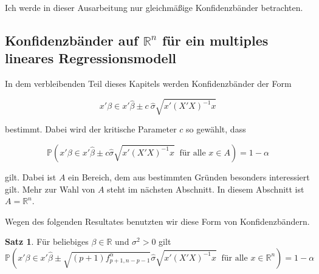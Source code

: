 \documentclass[12pt,a4paper]{article}
\theoremstyle{definition}
\newtheorem{Beispiel}[Definition]{Beispiel}
\theoremstyle{definition}
\newtheorem{Satz}[Definition]{Satz}
\theoremstyle{definition}
\begin{document}
Ich werde in dieser Ausarbeitung nur gleichmäßige Konfidenzbänder betrachten.



%
%
%
%

 

\subsection{Konfidenzbänder auf $\mathbb{R}^{n}$ für ein multiples lineares Regressionsmodell}
\label{Konfidenzbaender auf R fuer ein multiples lineares Regressionsmodell}
In dem verbleibenden Teil dieses Kapitels werden Konfidenzbänder der Form

\begin{equation*} \label{KB_allgemein}
x' \beta \in x'\hat{\beta} \pm c ~ \hat{\sigma}\sqrt{x'(X'X)^{-1}x}
\end{equation*}

bestimmt. Dabei wird der kritische Parameter $c$ so gewählt, dass 

\begin{equation*}
\mathbb{P}(x' \beta \in x'\hat{\beta} \pm c \hat{\sigma}\sqrt{x'(X'X)^{-1}x} ~ \text{ für alle } x \in A)=1-\alpha
\end{equation*}

gilt. Dabei ist $A$ ein Bereich, dem aus bestimmten Gründen besonders interessiert gilt. Mehr zur Wahl von $A$ steht im nächsten Abschnitt. In diesem Abschnitt ist $A = \mathbb{R}^n$.

Wegen des folgenden Resultates benutzten wir diese Form von Konfidenzbändern.

\begin{Satz} \label{KB_Eigenschaft}
Für beliebiges $\beta \in \mathbb{R}$ und $\sigma^2 > 0$ gilt 
\begin{equation*}
\mathbb{P}( x'\beta \in x' \hat{\beta} \pm \sqrt{(p+1) f^{\alpha}_{p+1,n-p-1}} \hat{\sigma} \sqrt{x' (X'X)^{-1}x} ~ \text{ für alle } x \in \mathbb{R}^n) = 1 - \alpha
\end{equation*}
\end{Satz} 
\end{document}
